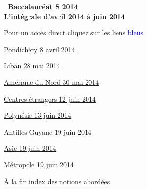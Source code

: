 \documentclass[10pt]{article}
\begin{document}
\setlength\parindent{0mm}
\renewcommand \footrulewidth{.2pt}
\pagestyle{fancy}
\thispagestyle{empty} 
\begin{center}
{\huge\textbf{\decofourleft~Baccalauréat S  
2014~\decofourright\\ \vspace{1cm} L'intégrale d'avril  2014 à  juin 2014}}

\vspace{1cm}

Pour un accès direct cliquez sur les liens {\Large 
\textcolor{blue}{bleus}}
\end{center}

\vspace{1cm}
 
{\Large \hyperlink{Pondichery}{Pondichéry  8 avril 2014}   \medskip

\hyperlink{Liban}{Liban  28  mai 2014}   \medskip

\hyperlink{AmeriqueNord}{Amérique du Nord 30  mai 2014}   \medskip

\hyperlink{Centres etrangers}{Centres étrangers 12  juin 2014}   \medskip

\hyperlink{Polynesie}{Polynésie 13  juin 2014}   \medskip

\hyperlink{Antilles}{Antilles-Guyane 19 juin 2014}   \medskip

\hyperlink{Asie}{Asie 19  juin 2014}   \medskip

\hyperlink{Metropole}{Métropole  19 juin 2014}   \medskip







}

\vspace{1cm}\hyperlink{Index}{À la fin index des notions abordées}
\end{document}

